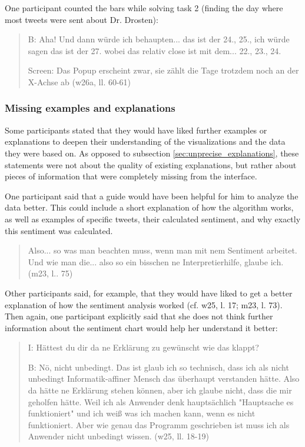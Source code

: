 One participant counted the bars while solving task 2 (finding the day where most tweets were sent about Dr. Drosten):

\begin{quote}
    B: Aha! Und dann würde ich behaupten... das ist der 24., 25., ich würde sagen das ist der 27. wobei das relativ close ist mit dem... 22., 23., 24. 

    Screen: Das Popup erscheint zwar, sie zählt die Tage trotzdem noch an der X-Achse ab (w26a, ll. 60-61)
\end{quote}

\subsubsection*{Missing examples and explanations}
Some participants stated that they would have liked further examples or explanations to deepen their understanding of the visualizations and the data they were based on. As opposed to subsection \ref{sec:unprecise_explanations}, these statements were not about the quality of existing explanations, but rather about pieces of information that were completely missing from the interface.

One participant said that a guide would have been helpful for him to analyze the data better. This could include a short explanation of how the algorithm works, as well as examples of specific tweets, their calculated sentiment, and why exactly this sentiment was calculated.

\begin{quote}
    Also... so was man beachten muss, wenn man mit nem Sentiment arbeitet. Und wie man die... also so ein bisschen ne Interpretierhilfe, glaube ich. (m23, l.. 75)
\end{quote}

Other participants said, for example, that they would have liked to get a better explanation of how the sentiment analysis worked (cf. w25, l. 17; m23, l. 73). Then again, one participant explicitly said that she does not think further information about the sentiment chart would help her understand it better:

\begin{quote}
    I: Hättest du dir da ne Erklärung zu gewünscht wie das klappt?

    B: Nö, nicht unbedingt. Das ist glaub ich so technisch, dass ich als nicht unbedingt Informatik-affiner Mensch das überhaupt verstanden hätte. Also da hätte ne Erklärung stehen können, aber ich glaube nicht, dass die mir geholfen hätte. Weil ich als Anwender denk hauptsächlich "Hauptsache es funktioniert" und ich weiß was ich machen kann, wenn es nicht funktioniert. Aber wie genau das Programm geschrieben ist muss ich als Anwender nicht unbedingt wissen. (w25, ll. 18-19)
\end{quote}



